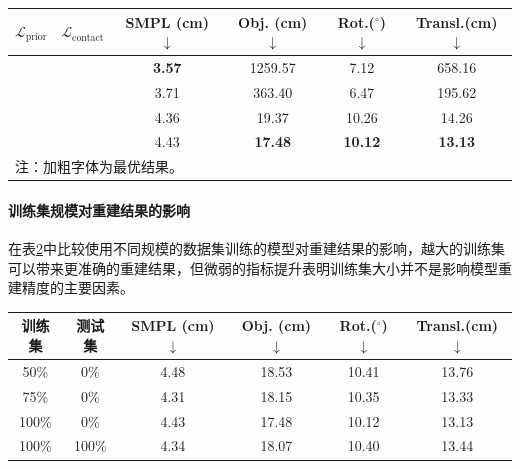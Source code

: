 \begin{table}[!htbp]
	\label{tab:ablation_contact_loss}
	\centering
	\footnotesize
	\setlength{\tabcolsep}{4pt}
	\renewcommand{\arraystretch}{1.2}
	\begin{tabular}{cccccc}
		\toprule
		$\mathcal{L}_{\text{prior}}$ & $\mathcal{L}_{\text{contact}}$ & SMPL (cm) $\downarrow$ & Obj. (cm) $\downarrow$ & Rot.($^\circ$) $\downarrow$ & Transl.(cm) $\downarrow$ \\
		\hline
		\XSolidBrush & \XSolidBrush & \textbf{3.57} & 1259.57 & 7.12 & 658.16 \\
		\XSolidBrush & \Checkmark & 3.71 & 363.40 & 6.47 & 195.62 \\
		\Checkmark & \XSolidBrush & 4.36 & 19.37 & 10.26 & 14.26 \\
		\Checkmark & \Checkmark & 4.43 & \textbf{17.48} & \textbf{10.12} & \textbf{13.13} \\
		\bottomrule
		\multicolumn{5}{l}{注：加粗字体为最优结果。}
	\end{tabular}
\end{table}

\paragraph{训练集规模对重建结果的影响} 在表\ref{tab:size_of_training_set}中比较使用不同规模的数据集训练的模型对重建结果的影响，越大的训练集可以带来更准确的重建结果，但微弱的指标提升表明训练集大小并不是影响模型重建精度的主要因素。

\begin{table}[!htbp]
	\label{tab:size_of_training_set}
	\centering
	\footnotesize
	\setlength{\tabcolsep}{4pt}
	\renewcommand{\arraystretch}{1.2}
	\begin{tabular}{cccccc}
		\toprule
		训练集 & 测试集 & SMPL (cm) $\downarrow$ & Obj. (cm) $\downarrow$ & Rot.($^\circ$) $\downarrow$ & Transl.(cm) $\downarrow$ \\
		\hline
		50\% & 0\% & 4.48 & 18.53 & 10.41 & 13.76 \\
		75\% & 0\% & 4.31 & 18.15 & 10.35 & 13.33 \\
		100\% & 0\% & 4.43 & 17.48 & 10.12 & 13.13 \\
		100\% & 100\% & 4.34 & 18.07 & 10.40 & 13.44 \\
		\bottomrule
	\end{tabular}
\end{table}

